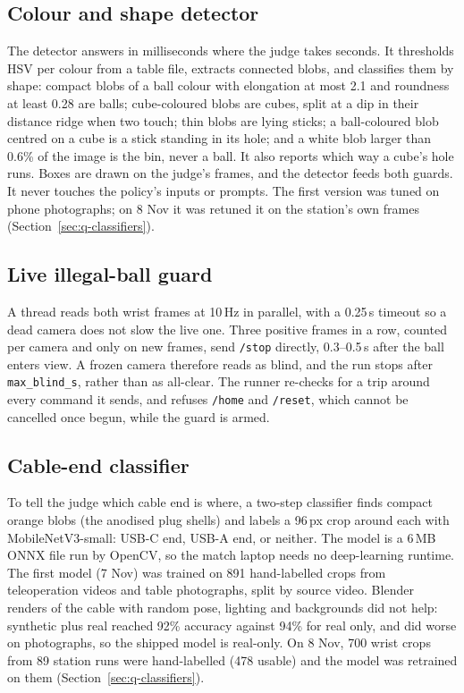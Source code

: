 \documentclass[10pt]{article}
\begin{document}
\subsection{Colour and shape detector}
The detector answers in milliseconds where the judge takes seconds. It thresholds HSV per colour from a table file, extracts
connected blobs, and classifies them by shape: compact blobs of a ball colour with elongation at most 2.1 and roundness at least
0.28 are balls; cube-coloured blobs are cubes, split at a dip in their distance ridge when two touch; thin blobs are lying sticks;
a ball-coloured blob centred on a cube is a stick standing in its hole; and a white blob larger than 0.6\% of the image is the
bin, never a ball. It also reports which way a cube's hole runs. Boxes are drawn on the judge's frames, and the detector feeds
both guards. It never touches the policy's inputs or prompts. The first version was tuned on phone photographs; on 8 Nov it was
retuned it on the station's own frames (Section~\ref{sec:q-classifiers}).

\subsection{Live illegal-ball guard}
A thread reads both wrist frames at 10\,Hz in parallel, with a 0.25\,s timeout so a dead camera does not slow the live one. Three
positive frames in a row, counted per camera and only on new frames, send \texttt{/stop} directly, 0.3--0.5\,s after the ball
enters view. A frozen camera therefore reads as blind, and the run stops after \texttt{max\_blind\_s}, rather than as all-clear.
The runner re-checks for a trip around every command it sends, and refuses \texttt{/home} and \texttt{/reset}, which cannot be
cancelled once begun, while the guard is armed.

\subsection{Cable-end classifier}
To tell the judge which cable end is where, a two-step classifier finds compact orange blobs (the anodised plug shells) and labels
a 96\,px crop around each with MobileNetV3-small: USB-C end, USB-A end, or neither. The model is a 6\,MB ONNX file run by OpenCV,
so the match laptop needs no deep-learning runtime. The first model (7 Nov) was trained on 891 hand-labelled crops from teleoperation
videos and table photographs, split by source video. Blender renders of the cable with random pose, lighting and backgrounds did not
help: synthetic plus real reached 92\% accuracy against 94\% for real only, and did worse on photographs, so the shipped model is
real-only. On 8 Nov, 700 wrist crops from 89 station runs were hand-labelled (478 usable) and the model was retrained on them (Section~\ref{sec:q-classifiers}).
\end{document}
